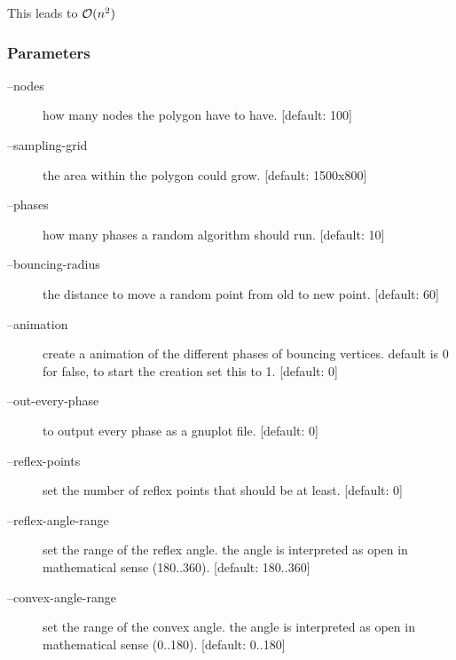 This leads to $\mathcal{O}(n^2)$

\subsubsection{Parameters}
\begin{description}
  \item [--nodes] how many nodes the polygon have to have. [default: 100]
  \item [--sampling-grid] the area within the polygon could grow. [default: 1500x800]
  \item [--phases] how many phases a random algorithm should run. [default: 10]
  \item [--bouncing-radius] the distance to move a random point from old to new point. [default: 60]
  \item [--animation] create a animation of the different phases of bouncing vertices. default is 0 for false, to start the creation set this to 1. [default: 0]
  \item [--out-every-phase] to output every phase as a gnuplot file. [default: 0]
  \item [--reflex-points] set the number of reflex points that should be at least. [default: 0]
  \item [--reflex-angle-range] set the range of the reflex angle. the angle is interpreted as open in mathematical sense (180..360). [default: 180..360]
  \item [--convex-angle-range] set the range of the convex angle. the angle is interpreted as open in mathematical sense (0..180). [default: 0..180]
\end{description}

